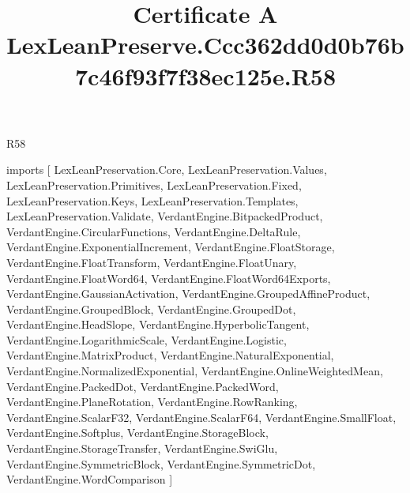 \begin{lexlean}{R58}
\title{Certificate A LexLeanPreserve.Ccc362dd0d0b76b7c46f93f7f38ec125e.R58}
\begin{coremodule}
imports [
  LexLeanPreservation.Core,
  LexLeanPreservation.Values,
  LexLeanPreservation.Primitives,
  LexLeanPreservation.Fixed,
  LexLeanPreservation.Keys,
  LexLeanPreservation.Templates,
  LexLeanPreservation.Validate,
  VerdantEngine.BitpackedProduct,
  VerdantEngine.CircularFunctions,
  VerdantEngine.DeltaRule,
  VerdantEngine.ExponentialIncrement,
  VerdantEngine.FloatStorage,
  VerdantEngine.FloatTransform,
  VerdantEngine.FloatUnary,
  VerdantEngine.FloatWord64,
  VerdantEngine.FloatWord64Exports,
  VerdantEngine.GaussianActivation,
  VerdantEngine.GroupedAffineProduct,
  VerdantEngine.GroupedBlock,
  VerdantEngine.GroupedDot,
  VerdantEngine.HeadSlope,
  VerdantEngine.HyperbolicTangent,
  VerdantEngine.LogarithmicScale,
  VerdantEngine.Logistic,
  VerdantEngine.MatrixProduct,
  VerdantEngine.NaturalExponential,
  VerdantEngine.NormalizedExponential,
  VerdantEngine.OnlineWeightedMean,
  VerdantEngine.PackedDot,
  VerdantEngine.PackedWord,
  VerdantEngine.PlaneRotation,
  VerdantEngine.RowRanking,
  VerdantEngine.ScalarF32,
  VerdantEngine.ScalarF64,
  VerdantEngine.SmallFloat,
  VerdantEngine.Softplus,
  VerdantEngine.StorageBlock,
  VerdantEngine.StorageTransfer,
  VerdantEngine.SwiGlu,
  VerdantEngine.SymmetricBlock,
  VerdantEngine.SymmetricDot,
  VerdantEngine.WordComparison
]


\end{coremodule}
\end{lexlean}
